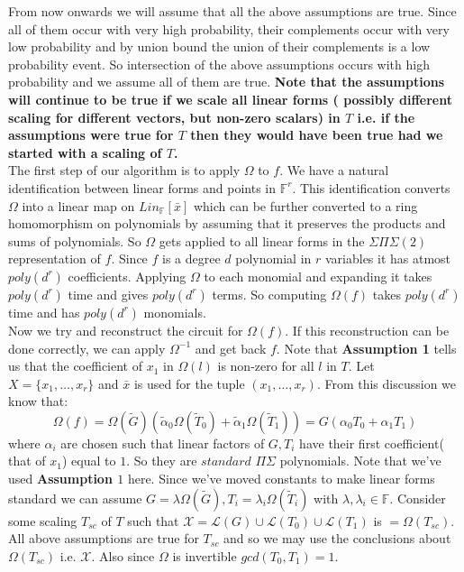 \documentclass[letterpaper,USenglish,numberwithinsect]{lipics}
\newcommand{\F}{\mathbb{F}}
\newcommand{\ML}{\mathcal{L}}
\newcommand{\MX}{\mathcal{X}}
\newcommand{\B}[1]{\bar{#1}}
\begin{document}
From now onwards we will assume that all the above assumptions are true. Since all of them occur with very high probability,
their complements occur with very low probability and by union bound the union of their complements is a low
probability event. So intersection of the above assumptions occurs with high probability and we assume all of them are true.
{\bf Note that the assumptions will continue to be true if we scale all linear forms ( possibly different scaling for different vectors, but non-zero scalars)
in $T$ i.e. if the assumptions were true for $T$ then they would have been true had we started with a scaling of $T$.}\\


The first step of our algorithm is to apply $\Omega$ to $f$. We have a natural identification between
linear forms and points in $\F^r$. This identification converts $\Omega$ into a linear map on $Lin_\F[\B{x}]$
which can be further converted to a ring homomorphism on polynomials by assuming that it preserves the products and sums of polynomials.
So $\Omega$ gets applied to all linear forms in the $\Sigma\Pi\Sigma(2)$ representation of $f$. Since $f$ is a degree $d$ polynomial in $r$
variables it has atmost $poly(d^r)$ coefficients. Applying $\Omega$ to each monomial and expanding it takes $poly(d^r)$ time and gives
$poly(d^r)$ terms. So computing $\Omega(f)$ takes $poly(d^r)$ time and has $poly(d^r)$ monomials.\\

Now we try and reconstruct the circuit for $\Omega(f)$. If this reconstruction can be
done correctly, we can apply $\Omega^{-1}$ and get back
$f$. Note that {\bf Assumption 1} tells us that the coefficient of $x_1$ in $\Omega(l)$ is non-zero for all $l$ in $T$.
Let $X = \{x_1,\ldots,x_r\}$ and $\B{x}$ is used for the tuple $(x_1,\ldots,x_r)$. From this discussion we know that:
\[
 \Omega(f) = \Omega(\tilde G)(\tilde \alpha_0\Omega(\tilde T_0) + \tilde \alpha_1\Omega(\tilde T_1)) = G(\alpha_0 T_0 + \alpha_1 T_1)
\]
where $\alpha_i$ are chosen such that linear factors of $G,T_i$ have their first coefficient( that of $x_1$) equal to $1$. So they are $standard$
$\Pi\Sigma$ polynomials. Note that we've used {\bf Assumption $1$} here. Since we've moved constants to make linear forms standard we can
assume $G = \lambda\Omega(\tilde G), T_i = \lambda_i \Omega(\tilde T_i)$ with $\lambda,\lambda_i \in \F$. Consider some scaling $T_{sc}$ of $T$
such that $\MX = \ML(G)\cup \ML(T_0)\cup \ML(T_1)$ is $ = \Omega(T_{sc})$. All above assumptions are true for $T_{sc}$ and so we may use the conclusions
about $\Omega(T_{sc})$ i.e. $\MX$. Also since $\Omega$ is invertible $gcd(T_0,T_1)=1$.\\
\end{document}
